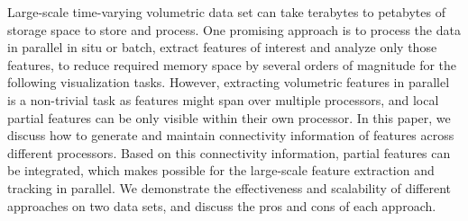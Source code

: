 Large-scale time-varying volumetric data set can take terabytes to petabytes of storage space to store and process. One promising approach is to process the data in parallel in situ or batch, extract features of interest and analyze only those features, to reduce required memory space by several orders of magnitude for the following visualization tasks. However, extracting volumetric features in parallel is a non-trivial task as features might span over multiple processors, and local partial features can be only visible within their own processor. In this paper, we discuss how to generate and maintain connectivity information of features across different processors. Based on this connectivity information, partial features can be integrated, which makes possible for the large-scale feature extraction and tracking in parallel. We demonstrate the effectiveness and scalability of different approaches on two data sets, and discuss the pros and cons of each approach.